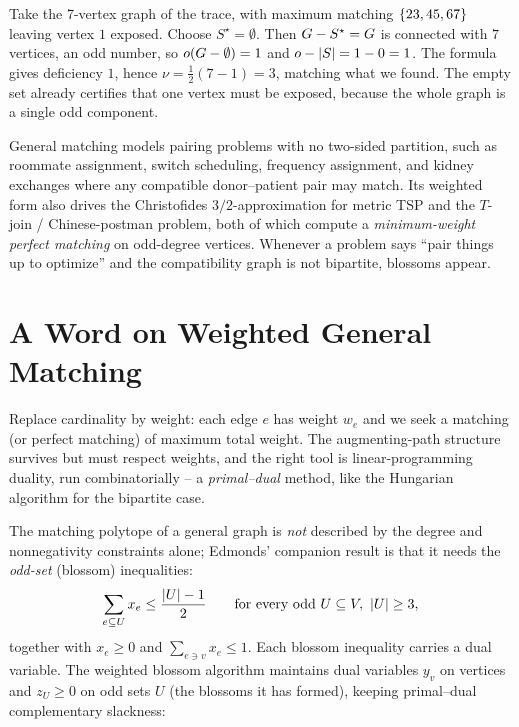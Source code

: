 \begin{example}[A certificate]
\label{ch17:ex-cert}
Take the 7-vertex graph of the trace, with maximum matching $\{23,45,67\}$ leaving vertex $1$
exposed. Choose $S^{\star}=\emptyset$. Then $G-S^{\star}=G$ is connected with $7$ vertices, an
odd number, so $o(G-\emptyset)=1$ and $o-\lvert S\rvert=1-0=1$. The formula gives deficiency $1$, hence
$\nu=\tfrac12(7-1)=3$, matching what we found. The empty set already certifies that one vertex must be
exposed, because the whole graph is a single odd component.
\end{example}

\begin{applicationbox}
General matching models pairing problems with no two-sided partition, such as roommate assignment,
switch scheduling, frequency assignment, and kidney exchanges where any compatible donor--patient pair
may match. Its weighted form also drives the Christofides $3/2$-approximation for metric TSP and the
$T$-join / Chinese-postman problem, both of which compute a \emph{minimum-weight perfect matching} on
odd-degree vertices. Whenever a problem says ``pair things up to optimize'' and the compatibility graph is not
bipartite, blossoms appear.
\end{applicationbox}

\section{A Word on Weighted General Matching}

Replace cardinality by weight: each edge $e$ has weight $w_e$ and we seek a matching (or perfect
matching) of maximum total weight. The augmenting-path structure survives but must respect weights, and
the right tool is linear-programming duality, run combinatorially -- a \emph{primal--dual} method, like
the Hungarian algorithm for the bipartite case.

The matching polytope of a general graph is \emph{not} described by the degree and nonnegativity
constraints alone; Edmonds' companion result is that it needs the \emph{odd-set} (blossom)
inequalities:
\[
\sum_{e\subseteq U} x_e \le \frac{\lvert U\rvert-1}{2}\qquad\text{for every odd }U\subseteq V,\ \lvert U\rvert\ge 3,
\]
together with $x_e\ge 0$ and $\sum_{e\ni v}x_e\le 1$. Each blossom inequality carries a dual variable.
The weighted blossom algorithm maintains dual variables $y_v$ on vertices and $z_U\ge 0$ on odd sets
$U$ (the blossoms it has formed), keeping primal--dual complementary slackness:

